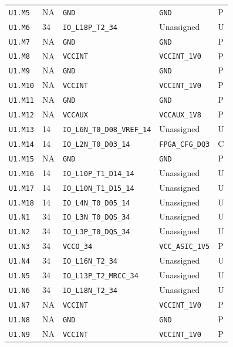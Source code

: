 \documentclass[11pt,a4paper]{article}
\begin{document}
\begin{longtable}{@{}P{20mm}P{10mm}P{70mm}P{51mm}P{11mm}@{}}
\nolinkurl{U1.M5} & NA & \nolinkurl{GND} & \nolinkurl{GND} & P \\
\nolinkurl{U1.M6} & 34 & \nolinkurl{IO_L18P_T2_34} & Unassigned & U \\
\nolinkurl{U1.M7} & NA & \nolinkurl{GND} & \nolinkurl{GND} & P \\
\nolinkurl{U1.M8} & NA & \nolinkurl{VCCINT} & \nolinkurl{VCCINT_1V0} & P \\
\nolinkurl{U1.M9} & NA & \nolinkurl{GND} & \nolinkurl{GND} & P \\
\nolinkurl{U1.M10} & NA & \nolinkurl{VCCINT} & \nolinkurl{VCCINT_1V0} & P \\
\nolinkurl{U1.M11} & NA & \nolinkurl{GND} & \nolinkurl{GND} & P \\
\nolinkurl{U1.M12} & NA & \nolinkurl{VCCAUX} & \nolinkurl{VCCAUX_1V8} & P \\
\nolinkurl{U1.M13} & 14 & \nolinkurl{IO_L6N_T0_D08_VREF_14} & Unassigned & U \\
\nolinkurl{U1.M14} & 14 & \nolinkurl{IO_L2N_T0_D03_14} & \nolinkurl{FPGA_CFG_DQ3} & C \\
\nolinkurl{U1.M15} & NA & \nolinkurl{GND} & \nolinkurl{GND} & P \\
\nolinkurl{U1.M16} & 14 & \nolinkurl{IO_L10P_T1_D14_14} & Unassigned & U \\
\nolinkurl{U1.M17} & 14 & \nolinkurl{IO_L10N_T1_D15_14} & Unassigned & U \\
\nolinkurl{U1.M18} & 14 & \nolinkurl{IO_L4N_T0_D05_14} & Unassigned & U \\
\nolinkurl{U1.N1} & 34 & \nolinkurl{IO_L3N_T0_DQS_34} & Unassigned & U \\
\nolinkurl{U1.N2} & 34 & \nolinkurl{IO_L3P_T0_DQS_34} & Unassigned & U \\
\nolinkurl{U1.N3} & 34 & \nolinkurl{VCCO_34} & \nolinkurl{VCC_ASIC_1V5} & P \\
\nolinkurl{U1.N4} & 34 & \nolinkurl{IO_L16N_T2_34} & Unassigned & U \\
\nolinkurl{U1.N5} & 34 & \nolinkurl{IO_L13P_T2_MRCC_34} & Unassigned & U \\
\nolinkurl{U1.N6} & 34 & \nolinkurl{IO_L18N_T2_34} & Unassigned & U \\
\nolinkurl{U1.N7} & NA & \nolinkurl{VCCINT} & \nolinkurl{VCCINT_1V0} & P \\
\nolinkurl{U1.N8} & NA & \nolinkurl{GND} & \nolinkurl{GND} & P \\
\nolinkurl{U1.N9} & NA & \nolinkurl{VCCINT} & \nolinkurl{VCCINT_1V0} & P \\

\end{longtable}
\end{document}
